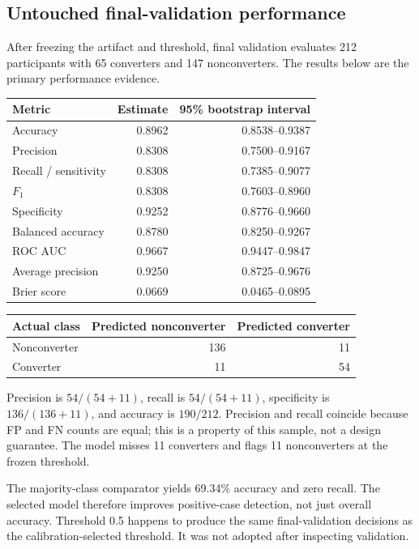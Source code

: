\documentclass[11pt,a4paper]{article}
\begin{document}
\subsection{Untouched final-validation performance}
After freezing the artifact and threshold, final validation evaluates 212 participants with 65 converters and 147 nonconverters. The results below are the primary performance evidence.
\begin{center}\small\renewcommand{\arraystretch}{1.15}
\begin{tabular}{lrr}\toprule
Metric & Estimate & 95\% bootstrap interval\\\midrule
Accuracy & 0.8962 & 0.8538--0.9387\\
Precision & 0.8308 & 0.7500--0.9167\\
Recall / sensitivity & 0.8308 & 0.7385--0.9077\\
$F_1$ & 0.8308 & 0.7603--0.8960\\
Specificity & 0.9252 & 0.8776--0.9660\\
Balanced accuracy & 0.8780 & 0.8250--0.9267\\
ROC AUC & 0.9667 & 0.9447--0.9847\\
Average precision & 0.9250 & 0.8725--0.9676\\
Brier score & 0.0669 & 0.0465--0.0895\\
\bottomrule\end{tabular}\end{center}
\begin{center}\small\renewcommand{\arraystretch}{1.15}
\begin{tabular}{lrr}\toprule
Actual class & Predicted nonconverter & Predicted converter\\\midrule
Nonconverter & 136 & 11\\
Converter & 11 & 54\\
\bottomrule\end{tabular}\end{center}
Precision is $54/(54+11)$, recall is $54/(54+11)$, specificity is $136/(136+11)$, and accuracy is $190/212$. Precision and recall coincide because FP and FN counts are equal; this is a property of this sample, not a design guarantee. The model misses 11 converters and flags 11 nonconverters at the frozen threshold.

The majority-class comparator yields 69.34\% accuracy and zero recall. The selected model therefore improves positive-case detection, not just overall accuracy. Threshold 0.5 happens to produce the same final-validation decisions as the calibration-selected threshold. It was not adopted after inspecting validation.
\end{document}
